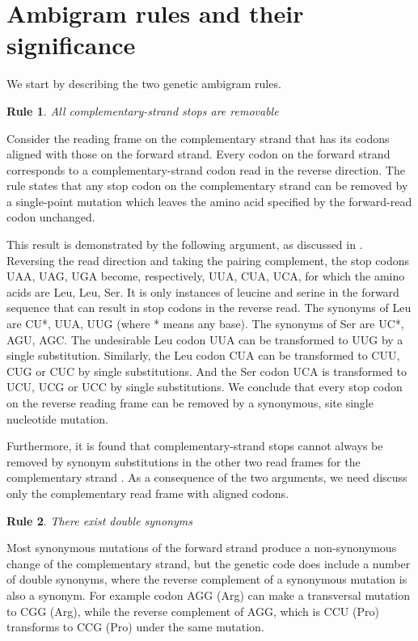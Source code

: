\documentclass[unnumsec,webpdf,contemporary,large,namedate]{oup-authoring-template}%
\theoremstyle{thmstyleone}%
\newtheorem{ambirule}{Rule}%
\theoremstyle{thmstyletwo}%
\theoremstyle{thmstylethree}%
\begin{document}
\section{Ambigram rules and their significance}
\label{sec: 2}

We start by describing the two genetic ambigram rules.

\begin{ambirule}All complementary-strand stops are removable \label{rule1}
\end{ambirule}

Consider the reading frame on the complementary strand that has its 
codons aligned with those on the forward strand. Every codon on the forward 
strand corresponds to a complementary-strand codon read in the reverse 
direction. The rule states that any stop codon on the complementary strand 
can be removed by a single-point mutation which leaves the amino acid specified by the 
forward-read codon unchanged. 

This result is demonstrated by the following argument, as discussed in \cite{DeR+19}. Reversing the read direction 
and taking the pairing complement, the stop codons UAA, UAG, UGA become, respectively, 
UUA, CUA, UCA, for which the amino acids are Leu, Leu, Ser. It is only instances of leucine and 
serine in the forward sequence that can result in stop codons in the reverse read. 
The synonyms of Leu are  CU*,  UUA, UUG (where * means any base).
The synonyms of Ser are UC*, AGU, AGC. The undesirable Leu codon UUA can be transformed 
to UUG by a single substitution. Similarly, the Leu codon CUA can be transformed to 
CUU, CUG or CUC by single substitutions. And the Ser codon UCA is transformed to UCU, UCG or UCC
by single substitutions. We conclude that every stop codon on the reverse reading frame can be removed 
by a synonymous, site single nucleotide mutation. 

Furthermore, it is found that complementary-strand stops cannot always be removed by synonym substitutions 
in the other two read frames for the complementary strand \citep[each case requires a separate and somewhat 
involved argument, also given in][]{DeR+19}. As a consequence of the two arguments, we need discuss only the 
complementary read frame with aligned codons.

\begin{ambirule}There exist double synonyms\label{rule2}
\end{ambirule}

Most synonymous mutations of the forward strand produce a non-synonymous change of the 
complementary strand, but the genetic code does include a number of double synonyms, 
where the reverse complement of a synonymous mutation is also a synonym. 
For example codon AGG (Arg) can make a transversal mutation to CGG (Arg), 
while the reverse complement of AGG, which is CCU (Pro) transforms to CCG (Pro) under 
the same mutation. 
\end{document}
